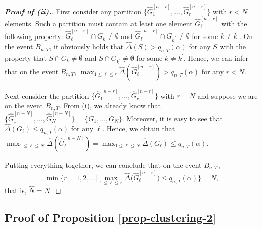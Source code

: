 \documentclass[a4paper,12pt]{article}
\begin{document}
\begin{proof}[\textnormal{\textbf{Proof of (ii).}}]
First consider any partition $\{ \widehat{G}_1^{[n-r]},\ldots,\widehat{G}_r^{[n-r]} \}$ with $r < N$ elements. Such a partition must contain at least one element $\widehat{G}_\ell^{[n-r]}$ with the following property: $\widehat{G}_\ell^{[n-r]} \cap G_k \ne \emptyset$ and $\widehat{G}_\ell^{[n-r]} \cap G_{k^\prime} \ne \emptyset$ for some $k \ne k^\prime$. On the event $B_{n,T}$, it obviously holds that $\widehat{\Delta}(S) > q_{n,T}(\alpha)$ for any $S$ with the property that $S \cap G_k \ne \emptyset$ and $S \cap G_{k^\prime} \ne \emptyset$ for some $k \ne k^\prime$. Hence, we can infer that on the event $B_{n,T}$, $\max_{1 \le \ell \le r} \widehat{\Delta} ( \widehat{G}_\ell^{[n-r]} ) > q_{n,T}(\alpha)$ for any $r < N$. 

Next consider the partition $\{ \widehat{G}_1^{[n-r]},\ldots,\widehat{G}_r^{[n-r]} \}$ with $r = N$ and suppose we are on the event $B_{n,T}$. From (i), we already know that $\{ \widehat{G}_1^{[n-N]},\ldots,\widehat{G}_N^{[n-N]} \} =\{ G_1,\ldots,G_N \}$. Moreover, it is easy to see that $\widehat{\Delta}(G_\ell) \le q_{n,T}(\alpha)$ for any $\ell$. Hence, we obtain that $\max_{1 \le \ell \le N} \widehat{\Delta} ( \widehat{G}_\ell^{[n-N]} ) = \max_{1 \le \ell \le N} \widehat{\Delta} (G_\ell) \le q_{n,T}(\alpha)$.

Putting everything together, we can conclude that on the event $B_{n,T}$, 
\[ \min \Big\{ r = 1,2,\ldots \Big| \max_{1 \le \ell \le r} \widehat{\Delta} \big( \widehat{G}_\ell^{[n-r]} \big) \le q_{n,T}(\alpha) \Big\} = N, \]
that is, $\widehat{N} = N$. 
\end{proof}



\subsection*{Proof of Proposition \ref{prop-clustering-2}}
\end{document}
